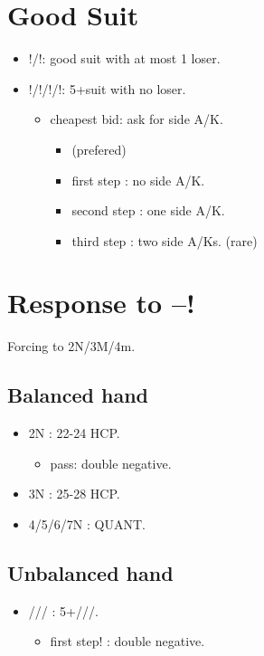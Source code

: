 \documentclass[12pt,twoside,a5paper]{report}%
\begin{document}
	\section*{Good Suit}
		\begin{itemize}
		\renewcommand{\labelitemi}{}
			\item {}!/\sp{}!: good suit with at most 1 loser.
			\item {}!/\di{}!/\he{}!/\sp{}!: 5+suit with no loser.
			\begin{itemize}
			\renewcommand{\labelitemi}{--}
			\item cheapest bid: ask for side A/K.
				\begin{itemize}
				\renewcommand{\labelitemi}{--}
					\item (prefered)
					\item first step : no side A/K.
					\item second step : one side A/K.
					\item third step : two side A/Ks. (rare)			
				\end{itemize}
			\end{itemize}
		\end{itemize}

	\section*{Response to --!}
	Forcing to 2N/3M/4m.
		\subsection*{Balanced hand}
			\begin{itemize}
			\renewcommand{\labelitemi}{}
				\item 2N : 22-24 HCP.
				\begin{itemize}
				\renewcommand{\labelitemi}{--}
					\item pass: double negative.
				\end{itemize}
				\item 3N : 25-28 HCP.
				\item 4/5/6/7N : QUANT.
			\end{itemize}

		\subsection*{Unbalanced hand}
			\begin{itemize}
			\renewcommand{\labelitemi}{}
				\item {}/// : 5+\he{}/\sp{}/\cl{}/\di{}.
				\begin{itemize}
				\renewcommand{\labelitemi}{--}
					\item first step! : double negative.
				\end{itemize}
			\end{itemize}
\end{document}

